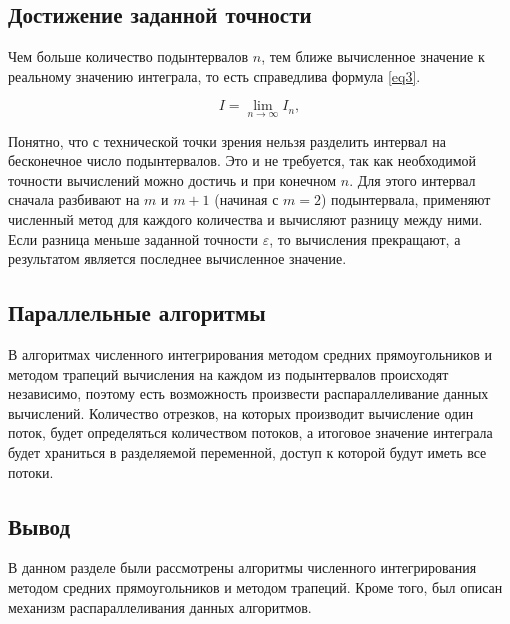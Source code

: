 \subsection{Достижение заданной точности}

Чем больше количество подынтервалов $n$, тем ближе вычисленное значение к реальному значению интеграла, то есть справедлива формула \ref{eq3}.

\begin{equation}\label{eq3}
    I = \lim\limits_{n \to \infty} I_n,
\end{equation}

Понятно, что с технической точки зрения нельзя разделить интервал на
бесконечное число подынтервалов. Это и не требуется, так как необходимой
точности вычислений можно достичь и при конечном $n$. Для этого интервал сначала
разбивают на $m$ и $m + 1$ (начиная с $m=2$) подынтервала, применяют численный
метод для каждого количества и вычисляют разницу между ними. Если разница
меньше заданной точности $\varepsilon$, то вычисления прекращают, а результатом
является последнее вычисленное значение.

\subsection{Параллельные алгоритмы}

В алгоритмах численного интегрирования методом средних прямоугольников и методом трапеций вычисления на каждом из подынтервалов происходят независимо, поэтому есть возможность произвести распараллеливание данных вычислений. Количество отрезков, на которых производит вычисление один поток, будет определяться количеством потоков, а итоговое значение интеграла будет храниться в разделяемой переменной, доступ к которой будут иметь все потоки.

\subsection*{Вывод}

В данном разделе были рассмотрены алгоритмы численного интегрирования методом
средних прямоугольников и методом трапеций. Кроме того, был описан механизм распараллеливания данных алгоритмов.
